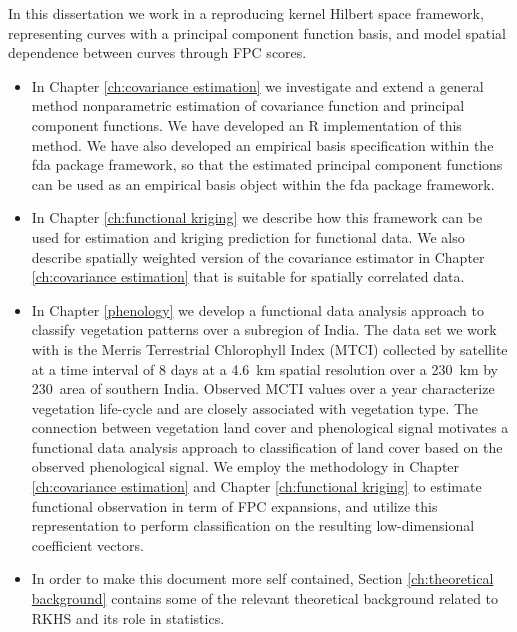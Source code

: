In this dissertation we work in a reproducing kernel Hilbert space framework, representing curves with a principal component function basis, and model spatial dependence between curves through FPC scores.  
\begin{itemize}
\item In Chapter \ref{ch:covariance estimation} we investigate and extend a general method nonparametric estimation of covariance function and principal component functions. We have developed an R implementation of this method. We have also developed an empirical basis specification within the fda package framework, so that the estimated principal component functions can be used as an empirical basis object within the fda package framework.  %

\item In Chapter \ref{ch:functional kriging} we describe how this framework can be used for estimation and kriging prediction for functional data. We also describe spatially weighted version of the covariance estimator in Chapter \ref{ch:covariance estimation} that is suitable for spatially correlated data.

\item  In Chapter \ref{phenology} we develop a functional data analysis approach to classify vegetation patterns over a subregion of India. The data set we work with is the Merris Terrestrial Chlorophyll Index (MTCI) collected by satellite at a time interval of 8 days at a 4.6~km spatial resolution over a 230~km by 230~area of southern India. Observed MCTI values over a year characterize vegetation life-cycle and are closely associated with vegetation type. The connection between vegetation land cover and phenological signal motivates a functional data analysis approach to classification of land cover based on the observed phenological signal. We employ the methodology in Chapter \ref{ch:covariance estimation} and Chapter \ref{ch:functional kriging} to estimate functional observation in term of FPC expansions, and utilize this representation to perform classification on the resulting low-dimensional coefficient vectors. 

\item In order to make this document more self contained, Section \ref{ch:theoretical background} contains some of the relevant theoretical background related to RKHS and its role in statistics. 
\end{itemize}


